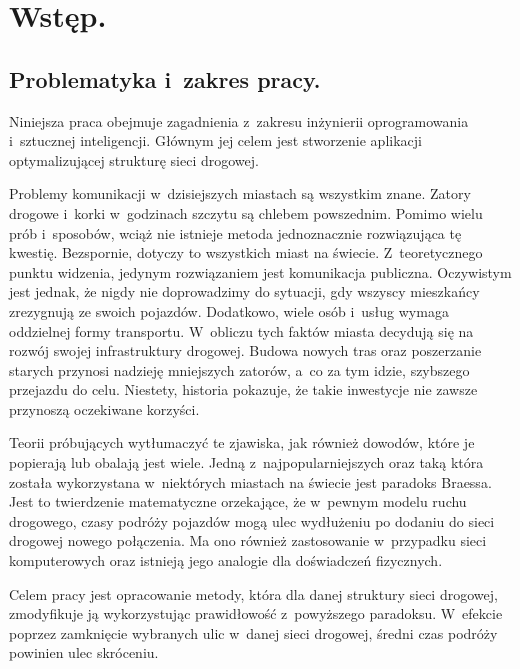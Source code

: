 \documentclass[twoside,12pt]{report}
\let\oldsection\chapter
\def\chapter{\cleardoublepage\oldsection}
\begin{document}


\tableofcontents	%

\chapter{Wstęp.} \label{rozdz.wstep} 

\section{Problematyka i~zakres pracy.}

Niniejsza praca obejmuje zagadnienia z~zakresu inżynierii oprogramowania i~sztucznej inteligencji. Głównym jej celem jest stworzenie aplikacji optymalizującej strukturę sieci drogowej.

Problemy komunikacji w~dzisiejszych miastach są wszystkim znane. Zatory drogowe i~korki w~godzinach szczytu są chlebem powszednim. Pomimo wielu prób i~sposobów, wciąż nie istnieje metoda jednoznacznie rozwiązująca tę kwestię. Bezspornie, dotyczy to wszystkich miast na świecie. Z~teoretycznego punktu widzenia, jedynym rozwiązaniem jest komunikacja publiczna. Oczywistym jest jednak, że nigdy nie doprowadzimy do sytuacji, gdy wszyscy mieszkańcy zrezygnują ze swoich pojazdów. Dodatkowo, wiele osób i~usług wymaga oddzielnej formy transportu. W~obliczu tych faktów miasta decydują się na rozwój swojej infrastruktury drogowej. Budowa nowych tras oraz poszerzanie starych przynosi nadzieję mniejszych zatorów, a~co za tym idzie, szybszego przejazdu do celu. Niestety, historia pokazuje, że takie inwestycje nie zawsze przynoszą oczekiwane korzyści.

Teorii próbujących wytłumaczyć te zjawiska, jak również dowodów, które je popierają lub obalają jest wiele. Jedną z~najpopularniejszych oraz taką która została wykorzystana w~niektórych miastach na świecie jest paradoks Braessa\cite{braess}. Jest to twierdzenie matematyczne orzekające, że w~pewnym modelu ruchu drogowego, czasy podróży pojazdów mogą ulec wydłużeniu po dodaniu do sieci drogowej nowego połączenia. Ma ono również  zastosowanie w~przypadku  sieci komputerowych oraz istnieją jego analogie dla doświadczeń fizycznych.

Celem pracy jest opracowanie metody, która dla danej struktury sieci drogowej, zmodyfikuje ją wykorzystując prawidłowość z~powyższego paradoksu. W~efekcie poprzez zamknięcie wybranych ulic w~danej sieci drogowej, średni czas podróży powinien ulec skróceniu.
\end{document}
